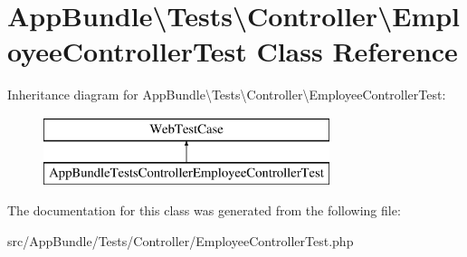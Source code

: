 \hypertarget{class_app_bundle_1_1_tests_1_1_controller_1_1_employee_controller_test}{}\section{App\+Bundle\textbackslash{}Tests\textbackslash{}Controller\textbackslash{}Employee\+Controller\+Test Class Reference}
\label{class_app_bundle_1_1_tests_1_1_controller_1_1_employee_controller_test}
Inheritance diagram for App\+Bundle\textbackslash{}Tests\textbackslash{}Controller\textbackslash{}Employee\+Controller\+Test\+:\begin{figure}[H]
\begin{center}
\leavevmode
\includegraphics[height=2.000000cm]{class_app_bundle_1_1_tests_1_1_controller_1_1_employee_controller_test}
\end{center}
\end{figure}


The documentation for this class was generated from the following file\+:\begin{DoxyCompactItemize}
\item 
src/\+App\+Bundle/\+Tests/\+Controller/Employee\+Controller\+Test.\+php\end{DoxyCompactItemize}
